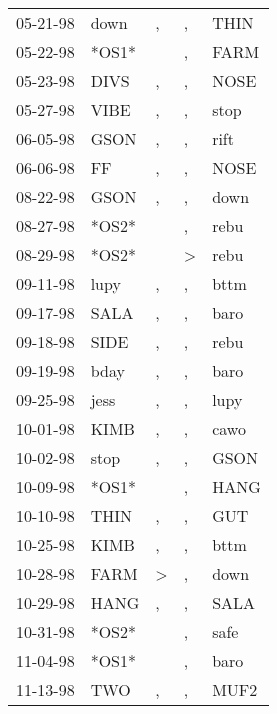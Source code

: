 \begin{supertabular}{lllll}
 05-21-98 &   down &                , &                , &   THIN \\
 05-22-98 &  *OS1* &                  &                , &   FARM \\
 05-23-98 &   DIVS &                , &                , &   NOSE \\
 05-27-98 &   VIBE &                , &                , &   stop \\
 06-05-98 &   GSON &                , &                , &   rift \\
 06-06-98 &     FF &                , &                , &   NOSE \\
 08-22-98 &   GSON &                , &                , &   down \\
 08-27-98 &  *OS2* &                  &                , &   rebu \\
 08-29-98 &  *OS2* &                  &     \textgreater &   rebu \\
 09-11-98 &   lupy &                , &                , &   bttm \\
 09-17-98 &   SALA &                , &                , &   baro \\
 09-18-98 &   SIDE &                , &                , &   rebu \\
 09-19-98 &   bday &                , &                , &   baro \\
 09-25-98 &   jess &                , &                , &   lupy \\
 10-01-98 &   KIMB &                , &                , &   cawo \\
 10-02-98 &   stop &                , &                , &   GSON \\
 10-09-98 &  *OS1* &                  &                , &   HANG \\
 10-10-98 &   THIN &                , &                , &    GUT \\
 10-25-98 &   KIMB &                , &                , &   bttm \\
 10-28-98 &   FARM &     \textgreater &                , &   down \\
 10-29-98 &   HANG &                , &                , &   SALA \\
 10-31-98 &  *OS2* &                  &                , &   safe \\
 11-04-98 &  *OS1* &                  &                , &   baro \\
 11-13-98 &    TWO &                , &                , &   MUF2 \\

\end{supertabular}
